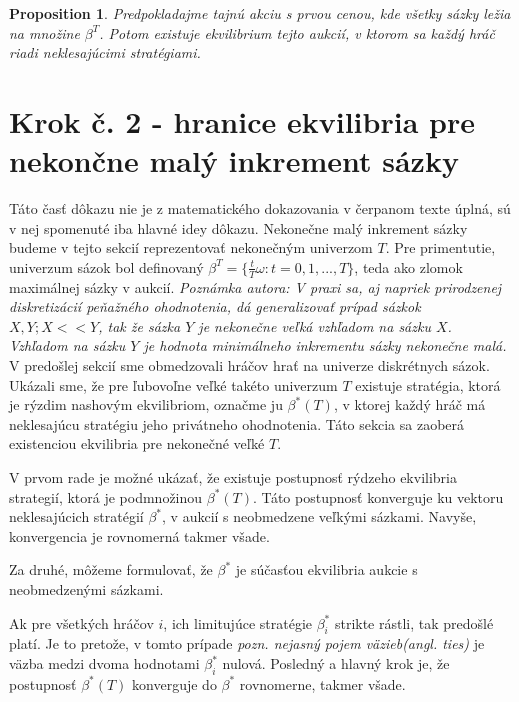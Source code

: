\documentclass[a4paper, 11pt]{article}
\newtheorem{proposition}[theorem]{Proposition}
\begin{document}
\begin{proposition}
Predpokladajme tajnú akciu s prvou cenou, kde všetky sázky ležia na množine $\beta^{T}$. Potom existuje ekvilibrium tejto aukcií, v ktorom sa každý hráč riadi neklesajúcimi stratégiami.
\end{proposition}

\section{Krok č. 2 - hranice ekvilibria pre nekončne malý inkrement sázky}
Táto časť dôkazu nie je z matematického dokazovania v čerpanom texte úplná, sú v nej spomenuté iba hlavné idey dôkazu. Nekonečne malý inkrement sázky budeme v tejto sekcií reprezentovať nekonečným univerzom $T$. Pre primentutie, univerzum sázok bol definovaný  $\beta^{T} = \{\frac{t}{T}\omega : t = 0,1,...,T\}$, teda ako zlomok maximálnej sázky v aukcií.
\newline{}\newline{}
\textit{Poznámka autora: V praxi sa, aj napriek prirodzenej diskretizácií peňažného ohodnotenia, dá generalizovať prípad sázkok $X,Y ;X << Y$, tak že sázka $Y$ je nekonečne veľká vzhľadom na sázku $X$. Vzhľadom na sázku $Y$ je hodnota minimálneho inkrementu sázky nekonečne malá.}\newline{}\newline{}
V predošlej sekcií sme obmedzovali hráčov hrať na univerze diskrétnych sázok. Ukázali sme, že pre ľubovoľne veľké takéto univerzum $T$ existuje stratégia, ktorá je rýzdim nashovým ekvilibriom, označme ju $\beta^{*}(T)$, v ktorej každý hráč má neklesajúcu stratégiu jeho privátneho ohodnotenia. Táto sekcia sa zaoberá existenciou ekvilibria pre nekonečné veľké $T$.

V prvom rade je možné ukázať, že existuje postupnosť rýdzeho ekvilibria strategií, ktorá je podmnožinou $\beta^{*}(T)$. Táto postupnosť konverguje ku vektoru neklesajúcich stratégií $\beta^{*}$, v aukcií s neobmedzene veľkými sázkami. Navyše, konvergencia je rovnomerná takmer všade. 

Za druhé, môžeme formulovať, že $\beta^{*}$ je súčasťou ekvilibria aukcie s neobmedzenými sázkami. 

Ak pre všetkých hráčov $i$, ich limitujúce stratégie $\beta^{*}_{i}$ strikte rástli, tak predošlé platí. Je to pretože, v tomto prípade \textit{pozn. nejasný pojem väzieb(angl. ties)} je väzba medzi dvoma hodnotami $\beta^{*}_{i}$ nulová. Posledný a hlavný krok je, že postupnosť $\beta^{*}(T)$ konverguje do $\beta^{*}$ rovnomerne, takmer všade. 
\end{document}
